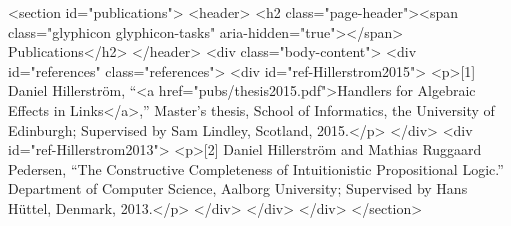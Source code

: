       <section id="publications">
	<header>
	  <h2 class="page-header"><span class="glyphicon glyphicon-tasks" aria-hidden="true"></span> Publications</h2>
	</header>
	<div class="body-content">
	  <div id="references" class="references">
<div id="ref-Hillerstrom2015">
<p>[1] Daniel Hillerström, “<a href="pubs/thesis2015.pdf">Handlers for Algebraic Effects in Links</a>,” Master’s thesis, School of Informatics, the University of Edinburgh; Supervised by Sam Lindley, Scotland, 2015.</p>
</div>
<div id="ref-Hillerstrom2013">
<p>[2] Daniel Hillerström and Mathias Ruggaard Pedersen, “The Constructive Completeness of Intuitionistic Propositional Logic.” Department of Computer Science, Aalborg University; Supervised by Hans Hüttel, Denmark, 2013.</p>
</div>
</div>
	</div>
      </section>
